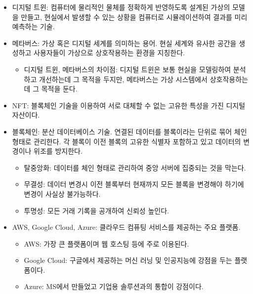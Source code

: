 \begin{itemize}
\item 디지털 트윈: 컴퓨터에 물리적인 물체를 정확하게 반영하도록 설계된 가상의 모델을 만들고, 현실에서 발생할 수 있는 상황을 컴퓨터로 시뮬레이션하여 결과를 미리 예측하는 기술.
\item 메타버스: 가상 혹은 디지털 세계를 의미하는 용어. 현실 세계와 유사한 공간을 생성하고 사용자들이 가상으로 상호작용하는 환경을 지칭한다.
\begin{itemize}
    \item 디지털 트윈, 메타버스의 차이점: 디지털 트윈은 보통 현실을 모델링하여 분석하고 개선하는데 그 목적을 두지만, 메타버스는 가상 시스템에서 상호작용하는데 그 목적을 둔다.
\end{itemize}

\item NFT: 블록체인 기술을 이용하여 서로 대체할 수 없는 고유한 특성을 가진 디지털 자산이다.
\item 블록체인: 분산 데이터베이스 기술. 연결된 데이터를 블록이라는 단위로 묶어 체인 형태로 관리한다. 각 블록이 이전 블록의 고유한 식별자 포함하고 있고 데이터의 변경이나 위조를 방지한다.
\begin{itemize}
  \item 탈중앙화: 데이터를 체인 형태로 관리하여 중앙 서버에 집중되는 것을 막는다.
  \item 무결성: 데이터 변경시 이전 블록부터 현재까지 모든 블록을 변경해야 하기에 변경이 사실상 불가능하다.
  \item 투명성: 모든 거래 기록을 공개하여 신뢰성 높인다.
\end{itemize}

\item AWS, Google Cloud, Azure: 클라우드 컴퓨팅 서비스를 제공하는 주요 플랫폼.
  \begin{itemize}
    \item AWS: 가장 큰 플랫폼이며 웹 호스팅 등에 주로 이용된다.
    \item Google Cloud: 구글에서 제공하는 머신 러닝 및 인공지능에 강점을 두는 플랫폼이다.
    \item Azure: MS에서 만들었고 기업용 솔루션과의 통합이 강점이다.
  \end{itemize}
\end{itemize}
